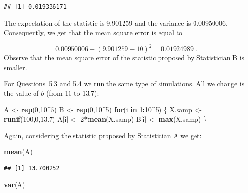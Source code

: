 \documentclass[]{krantz}
\makeatletter
\newenvironment{Shaded}{\begin{snugshade}}{\end{snugshade}}
\newcommand{\KeywordTok}[1]{\textcolor[rgb]{0.13,0.29,0.53}{\textbf{#1}}}
\newcommand{\DecValTok}[1]{\textcolor[rgb]{0.00,0.00,0.81}{#1}}
\newcommand{\FloatTok}[1]{\textcolor[rgb]{0.00,0.00,0.81}{#1}}
\newcommand{\StringTok}[1]{\textcolor[rgb]{0.31,0.60,0.02}{#1}}
\newcommand{\ControlFlowTok}[1]{\textcolor[rgb]{0.13,0.29,0.53}{\textbf{#1}}}
\newcommand{\OperatorTok}[1]{\textcolor[rgb]{0.81,0.36,0.00}{\textbf{#1}}}
\newcommand{\NormalTok}[1]{#1}
\newenvironment{kframe}{%
\medskip{}
\setlength{\fboxsep}{.8em}
 \def\at@end@of@kframe{}%
 \ifinner\ifhmode%
  \def\at@end@of@kframe{\end{minipage}}%
  \begin{minipage}{\columnwidth}%
 \fi\fi%
 \def\FrameCommand##1{\hskip\@totalleftmargin \hskip-\fboxsep
 \colorbox{shadecolor}{##1}\hskip-\fboxsep
     \hskip-\linewidth \hskip-\@totalleftmargin \hskip\columnwidth}%
 \MakeFramed {\advance\hsize-\width
   \@totalleftmargin\z@ \linewidth\hsize
   \@setminipage}}%
 {\par\unskip\endMakeFramed%
 \at@end@of@kframe}
\renewenvironment{Shaded}{\begin{kframe}}{\end{kframe}}
\theoremstyle{definition}
\theoremstyle{definition}
\theoremstyle{definition}
\theoremstyle{remark}
\makeatother
\begin{document}
\begin{verbatim}
## [1] 0.019336171
\end{verbatim}

The expectation of the statistic is 9.901259 and the variance is
0.00950006. Consequently, we get that the mean square error is equal to

\[0.00950006 + (9.901259 - 10)^2 = 0.01924989\;.\] Observe that the mean
square error of the statistic proposed by Statistician B is smaller.

For Questions~5.3 and 5.4 we run the same type of simulations. All we
change is the value of \(b\) (from 10 to 13.7):

\begin{Shaded}
\begin{Highlighting}[]
\NormalTok{A <-}\StringTok{ }\KeywordTok{rep}\NormalTok{(}\DecValTok{0}\NormalTok{,}\DecValTok{10}\OperatorTok{^}\DecValTok{5}\NormalTok{)}
\NormalTok{B <-}\StringTok{ }\KeywordTok{rep}\NormalTok{(}\DecValTok{0}\NormalTok{,}\DecValTok{10}\OperatorTok{^}\DecValTok{5}\NormalTok{)}
\ControlFlowTok{for}\NormalTok{(i }\ControlFlowTok{in} \DecValTok{1}\OperatorTok{:}\DecValTok{10}\OperatorTok{^}\DecValTok{5}\NormalTok{) \{}
\NormalTok{  X.samp <-}\StringTok{ }\KeywordTok{runif}\NormalTok{(}\DecValTok{100}\NormalTok{,}\DecValTok{0}\NormalTok{,}\FloatTok{13.7}\NormalTok{)}
\NormalTok{  A[i] <-}\StringTok{ }\DecValTok{2}\OperatorTok{*}\KeywordTok{mean}\NormalTok{(X.samp)}
\NormalTok{  B[i] <-}\StringTok{ }\KeywordTok{max}\NormalTok{(X.samp)}
\NormalTok{\}}
\end{Highlighting}
\end{Shaded}

Again, considering the statistic proposed by Statistician A we get:

\begin{Shaded}
\begin{Highlighting}[]
\KeywordTok{mean}\NormalTok{(A)}
\end{Highlighting}
\end{Shaded}

\begin{verbatim}
## [1] 13.700252
\end{verbatim}

\begin{Shaded}
\begin{Highlighting}[]
\KeywordTok{var}\NormalTok{(A)}
\end{Highlighting}
\end{Shaded}
\end{document}
